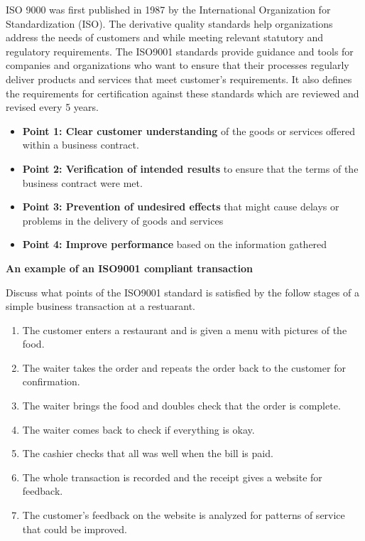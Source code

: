 \documentclass[]{book}
\providecommand{\tightlist}{%
  \setlength{\itemsep}{0pt}\setlength{\parskip}{0pt}}
\let\BeginKnitrBlock\begin \let\EndKnitrBlock\end
\begin{document}
ISO 9000 was first published in 1987 by the International Organization for Standardization (ISO). The derivative quality standards help organizations address the needs of customers and while meeting relevant statutory and regulatory requirements.\citep{ISOweb} The ISO9001 standards provide guidance and tools for companies and organizations who want to ensure that their processes regularly deliver products and services that meet customer's requirements. It also defines the requirements for certification against these standards which are reviewed and revised every 5 years.\citep{ISO2015}

\begin{itemize}
\tightlist
\item
  \textbf{Point 1: Clear customer understanding} of the goods or services offered within a business contract.
\item
  \textbf{Point 2: Verification of intended results} to ensure that the terms of the business contract were met.
\item
  \textbf{Point 3: Prevention of undesired effects} that might cause delays or problems in the delivery of goods and services
\item
  \textbf{Point 4: Improve performance} based on the information gathered
\end{itemize}

\BeginKnitrBlock{rmddiscussion}
\textbf{An example of an ISO9001 compliant transaction}

Discuss what points of the ISO9001 standard is satisfied by the follow stages of a simple business transaction at a restuarant.

\begin{enumerate}
\def\labelenumi{\arabic{enumi}.}
\tightlist
\item
  The customer enters a restaurant and is given a menu with pictures of the food.
\item
  The waiter takes the order and repeats the order back to the customer for confirmation.
\item
  The waiter brings the food and doubles check that the order is complete.
\item
  The waiter comes back to check if everything is okay.
\item
  The cashier checks that all was well when the bill is paid.
\item
  The whole transaction is recorded and the receipt gives a website for feedback.
\item
  The customer's feedback on the website is analyzed for patterns of service that could be improved.
\end{enumerate}
\EndKnitrBlock{rmddiscussion}
\end{document}
